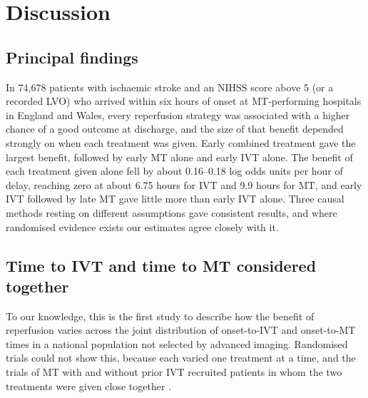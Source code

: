 
\section{Discussion}

\subsection{Principal findings}

In 74,678 patients with ischaemic stroke and an NIHSS score above 5 (or a recorded LVO) who arrived within six hours of onset at MT-performing hospitals in England and Wales, every reperfusion strategy was associated with a higher chance of a good outcome at discharge, and the size of that benefit depended strongly on when each treatment was given. Early combined treatment gave the largest benefit, followed by early MT alone and early IVT alone. The benefit of each treatment given alone fell by about 0.16--0.18 log odds units per hour of delay, reaching zero at about 6.75 hours for IVT and 9.9 hours for MT, and early IVT followed by late MT gave little more than early IVT alone. Three causal methods resting on different assumptions gave consistent results, and where randomised evidence exists our estimates agree closely with it.

\subsection{Time to IVT and time to MT considered together}

To our knowledge, this is the first study to describe how the benefit of reperfusion varies across the joint distribution of onset-to-IVT and onset-to-MT times in a national population not selected by advanced imaging. Randomised trials could not show this, because each varied one treatment at a time, and the trials of MT with and without prior IVT recruited patients in whom the two treatments were given close together \cite{kaesmacher2024,majoie2023}.

